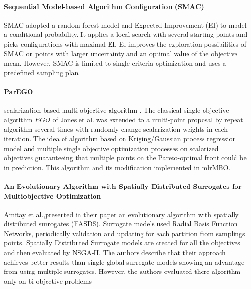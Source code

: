         \paragraph{Sequential Model-based Algorithm Configuration (SMAC)} SMAC\cite{smac-2017} adopted a random forest model and Expected Improvement (EI) to model a conditional probability. It applies a local search with several starting points and picks configurations with maximal EI. EI improves the exploration possibilities of SMAC on points with larger uncertainty and an optimal value of the objective mean. However, SMAC is limited to single-criteria optimization and uses a predefined sampling plan.


        \paragraph{ParEGO} scalarization based multi-objective algorithm \cite{Knowles06}. The classical single-objective algorithm $EGO$ of Jones et al.  was extended to a multi-point proposal by repeat algorithm several times with randomly change scalarization weights in each iteration.  The idea of algorithm based on Kriging/Gaussian process regression model and multiple single objective optimization processes on scalarized objectives guaranteeing that multiple points on the Pareto-optimal front could be in prediction. This algorithm and its modification implemented in mlrMBO\cite{BischlmlrMBO}.


        \paragraph{An Evolutionary Algorithm with Spatially Distributed Surrogates for Multiobjective Optimization} Amitay et al.,\cite{DistrSurr}presented in their paper an evolutionary algorithm with spatially distributed surrogates (EASDS). Surrogate models used Radial Basis Function Networks, periodically validation and updating for each partition from samplings points. Spatially Distributed Surrogate models are created for all the objectives and then evaluated by NSGA-II. The authors describe that their approach achieves better results than single global surrogate models showing an advantage from using multiple surrogates. However, the authors evaluated there algorithm only on bi-objective problems

